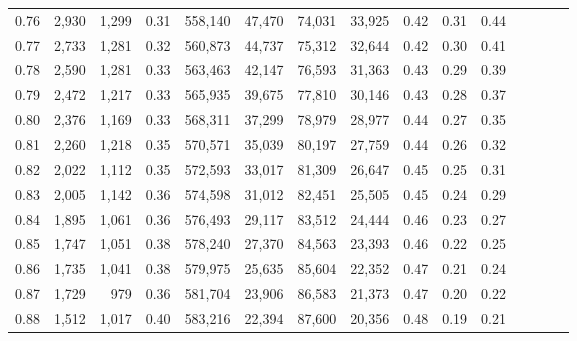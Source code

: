 \begin{tabular}{rrrcrrrrrrrrrrr}
0.76 &   2,930 &   1,299 &                                       0.31 &  558,140 &   47,470 &   74,031 &   33,925 &  0.42 &  0.31 &                         0.44 \\
0.77 &   2,733 &   1,281 &                                       0.32 &  560,873 &   44,737 &   75,312 &   32,644 &  0.42 &  0.30 &                         0.41 \\
0.78 &   2,590 &   1,281 &                                       0.33 &  563,463 &   42,147 &   76,593 &   31,363 &  0.43 &  0.29 &                         0.39 \\
0.79 &   2,472 &   1,217 &                                       0.33 &  565,935 &   39,675 &   77,810 &   30,146 &  0.43 &  0.28 &                         0.37 \\
0.80 &   2,376 &   1,169 &                                       0.33 &  568,311 &   37,299 &   78,979 &   28,977 &  0.44 &  0.27 &                         0.35 \\
0.81 &   2,260 &   1,218 &                                       0.35 &  570,571 &   35,039 &   80,197 &   27,759 &  0.44 &  0.26 &                         0.32 \\
0.82 &   2,022 &   1,112 &                                       0.35 &  572,593 &   33,017 &   81,309 &   26,647 &  0.45 &  0.25 &                         0.31 \\
0.83 &   2,005 &   1,142 &                                       0.36 &  574,598 &   31,012 &   82,451 &   25,505 &  0.45 &  0.24 &                         0.29 \\
0.84 &   1,895 &   1,061 &                                       0.36 &  576,493 &   29,117 &   83,512 &   24,444 &  0.46 &  0.23 &                         0.27 \\
0.85 &   1,747 &   1,051 &                                       0.38 &  578,240 &   27,370 &   84,563 &   23,393 &  0.46 &  0.22 &                         0.25 \\
0.86 &   1,735 &   1,041 &                                       0.38 &  579,975 &   25,635 &   85,604 &   22,352 &  0.47 &  0.21 &                         0.24 \\
0.87 &   1,729 &     979 &                                       0.36 &  581,704 &   23,906 &   86,583 &   21,373 &  0.47 &  0.20 &                         0.22 \\
0.88 &   1,512 &   1,017 &                                       0.40 &  583,216 &   22,394 &   87,600 &   20,356 &  0.48 &  0.19 &                         0.21 \\

\end{tabular}
